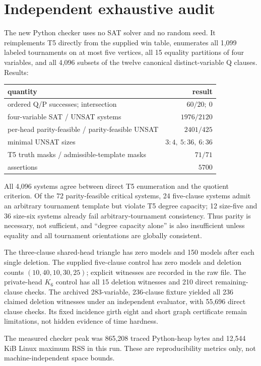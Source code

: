 \documentclass[11pt]{article}
\begin{document}
\section{Independent exhaustive audit}
The new Python checker uses no SAT solver and no random seed.  It reimplements T5 directly from the supplied win table, enumerates all 1,099 labeled tournaments on at most five vertices, all 15 equality partitions of four variables, and all 4,096 subsets of the twelve canonical distinct-variable Q clauses.  Results:
\begin{center}
\begin{tabular}{lr}
\toprule
quantity & result\\\midrule
ordered Q/P successes; intersection & $60/20;\ 0$\\
four-variable SAT / UNSAT systems & $1976/2120$\\
per-head parity-feasible / parity-feasible UNSAT & $2401/425$\\
minimal UNSAT sizes & $3{:}4,\ 5{:}36,\ 6{:}36$\\
T5 truth masks / admissible-template masks & $71/71$\\
assertions & $5700$\\
\bottomrule
\end{tabular}
\end{center}
All 4,096 systems agree between direct T5 enumeration and the quotient criterion.  Of the 72 parity-feasible critical systems, 24 five-clause systems admit an arbitrary tournament template but violate T5 degree capacity; 12 size-five and 36 size-six systems already fail arbitrary-tournament consistency.  Thus parity is necessary, not sufficient, and ``degree capacity alone'' is also insufficient unless equality and all tournament orientations are globally consistent.

The three-clause shared-head triangle has zero models and 150 models after each single deletion.  The supplied five-clause control has zero models and deletion counts $(10,40,10,30,25)$; explicit witnesses are recorded in the raw file.  The private-head $K_6$ control has all 15 deletion witnesses and 210 direct remaining-clause checks.  The archived 283-variable, 236-clause fixture yielded all 236 claimed deletion witnesses under an independent evaluator, with 55,696 direct clause checks.  Its fixed incidence girth eight and short graph certificate remain limitations, not hidden evidence of time hardness.

The measured checker peak was 865,208 traced Python-heap bytes and 12,544 KiB Linux maximum RSS in this run.  These are reproducibility metrics only, not machine-independent space bounds.
\end{document}
